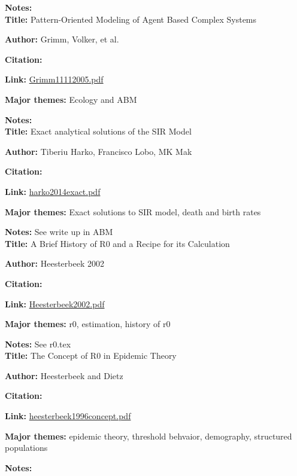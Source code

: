 \message{ !name(refs.tex)}\documentclass{article}
\begin{document}
\textbf{Notes:}
\\

\textbf{Title:} Pattern-Oriented Modeling of Agent Based Complex Systems

\textbf{Author:} Grimm, Volker, et al.

\textbf{Citation:} \cite{Grimm11112005}

\textbf{Link:} \url{Grimm11112005.pdf}

\textbf{Major themes:} Ecology and ABM

\textbf{Notes:}
\\

\textbf{Title:} Exact analytical solutions of the SIR Model

\textbf{Author:}  Tiberiu Harko, Francisco Lobo, MK Mak

\textbf{Citation:} \cite{harko2014exact}

\textbf{Link:} \url{harko2014exact.pdf}

\textbf{Major themes:}  Exact solutions to SIR model, death and birth rates

\textbf{Notes:}  See write up in ABM
\\

\textbf{Title:}  A Brief History of R0 and a Recipe for its Calculation

\textbf{Author:}  Heesterbeek 2002

\textbf{Citation:}\cite{Heesterbeek2002}

\textbf{Link:} \url{Heesterbeek2002.pdf}

\textbf{Major themes:}  r0, estimation, history of r0

\textbf{Notes:} See r0.tex
\\

\textbf{Title:}  The Concept of R0 in Epidemic Theory

\textbf{Author:}  Heesterbeek and Dietz

\textbf{Citation:}\cite{heesterbeek1996concept}

\textbf{Link:} \url{heesterbeek1996concept.pdf}

\textbf{Major themes:}  epidemic theory, threshold behvaior, demography, structured populations

\textbf{Notes:}
\\
\end{document}
